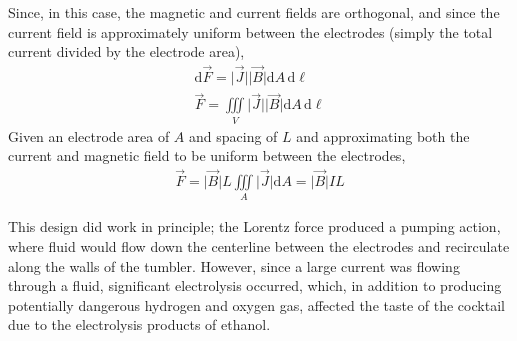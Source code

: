 \documentclass[]{article}
\begin{document}
Since, in this case, the magnetic and current fields are orthogonal, and since the current field is approximately uniform between the electrodes (simply the total current divided by the electrode area),
\begin{align}
\mathrm{d}\vec{F}=\lvert\vec{J}\rvert\lvert\vec{B}\rvert\mathrm{d}A\,\mathrm{d}\ell\\
\vec{F}=\iiint\limits_V\lvert\vec{J}\rvert\lvert\vec{B}\rvert\mathrm{d}A\,\mathrm{d}\ell
\end{align}
Given an electrode area of $A$ and spacing of $L$ and approximating both the current and magnetic field to be uniform between the electrodes,
\begin{align}
\vec{F}=\lvert\vec{B}\rvert L\iiint\limits_A\lvert\vec{J}\rvert\mathrm{d}A=\lvert\vec{B}\rvert IL
\end{align}
\par This design did work in principle; the Lorentz force produced a pumping action, where fluid would flow down the centerline between the electrodes and recirculate along the walls of the tumbler. However, since a large current was flowing through a fluid, significant electrolysis occurred, which, in addition to producing potentially dangerous hydrogen and oxygen gas, affected the taste of the cocktail due to the electrolysis products of ethanol.
\end{document}
